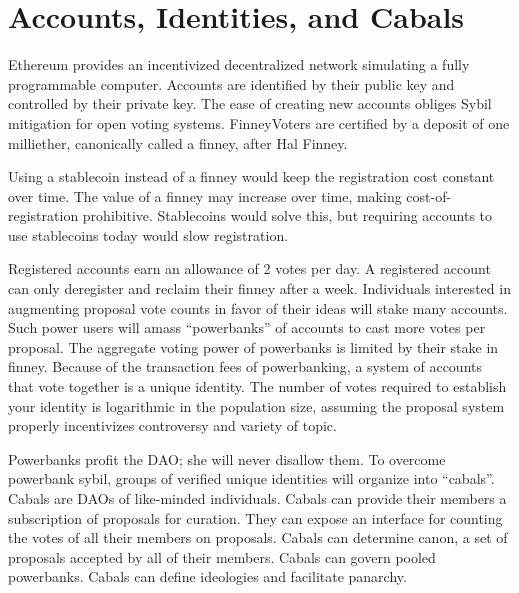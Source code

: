\documentclass{article}
\begin{document}
\section{Accounts, Identities, and Cabals}
Ethereum provides an incentivized decentralized network simulating a fully programmable computer.
Accounts are identified by their public key and controlled by their private key.
The ease of creating new accounts obliges Sybil mitigation for open voting systems.
FinneyVoters are certified by a deposit of one milliether, canonically called a finney, after Hal Finney.
\par
Using a stablecoin instead of a finney would keep the registration cost constant over time.
The value of a finney may increase over time, making cost-of-registration prohibitive.
Stablecoins would solve this, but requiring accounts to use stablecoins today would slow registration.
\par
Registered accounts earn an allowance of 2 votes per day.
A registered account can only deregister and reclaim their finney after a week.
Individuals interested in augmenting proposal vote counts in favor of their ideas will stake many accounts.
Such power users will amass ``powerbanks'' of accounts to cast more votes per proposal.
The aggregate voting power of powerbanks is limited by their stake in finney.
Because of the transaction fees of powerbanking, a system of accounts that vote together is a unique identity.
The number of votes required to establish your identity is logarithmic in the population size, assuming the proposal system properly incentivizes controversy and variety of topic.
\par
Powerbanks profit the DAO; she will never disallow them.
To overcome powerbank sybil, groups of verified unique identities will organize into ``cabals''.
Cabals are DAOs of like-minded individuals.
Cabals can provide their members a subscription of proposals for curation.
They can expose an interface for counting the votes of all their members on proposals.
Cabals can determine canon, a set of proposals accepted by all of their members.
Cabals can govern pooled powerbanks.
Cabals can define ideologies and facilitate panarchy.
\end{document}
